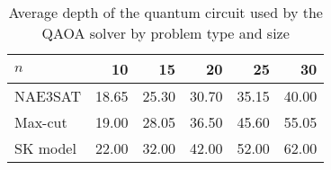 \begin{table}[!ht]
    \centering
    \begin{tabular}{lrrrrr} \toprule
        $n$ & 10 & 15 & 20 & 25 & 30\\ \midrule
        NAE3SAT & 18.65 & 25.30 & 30.70 & 35.15 & 40.00 \\
        Max-cut & 19.00 & 28.05 & 36.50 & 45.60 & 55.05 \\
        SK model & 22.00 & 32.00 & 42.00 & 52.00 & 62.00\\ \bottomrule
    \end{tabular}
    \caption{Average depth of the quantum circuit used by the QAOA solver by problem type and size}
    \label{table:depth}
\end{table}